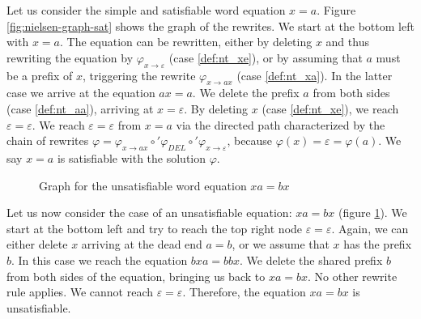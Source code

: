 Let us consider the simple and satisfiable word equation $x = a$. Figure \ref{fig:nielsen-graph-sat} shows the graph of the rewrites. We start at the bottom left with $x = a$. The equation can be rewritten, either by deleting $x$ and thus rewriting the equation by $\varphi_{x \rightarrow \varepsilon}$ (case \ref{def:nt_xe}), or by assuming that $a$ must be a prefix of $x$, triggering the rewrite $\varphi_{x \rightarrow ax}$ (case \ref{def:nt_xa}). In the latter case we arrive at the equation $ax = a$. We delete the prefix $a$ from both sides (case \ref{def:nt_aa}), arriving at $x = \varepsilon$. By deleting $x$ (case \ref{def:nt_xe}), we reach $\varepsilon = \varepsilon$. We reach $\varepsilon = \varepsilon$ from $x = a$ via the directed path characterized by the chain of rewrites $\varphi = \varphi_{x \rightarrow ax} \circ' \varphi_{DEL} \circ' \varphi_{x \rightarrow \varepsilon}$, because $\varphi(x) = \varepsilon = \varphi(a)$. We say $x = a$ is satisfiable with the solution $\varphi$.

\begin{figure}[H]
\begin{center}
\caption{Graph for the unsatisfiable word equation $xa = bx$}
\label{fig:nielsen-graph-unsat}
\end{center}
\end{figure}

Let us now consider the case of an unsatisfiable equation: $xa = bx$ (figure \ref{fig:nielsen-graph-unsat}). We start at the bottom left and try to reach the top right node $\varepsilon = \varepsilon$. Again, we can either delete $x$ arriving at the dead end $a = b$, or we assume that $x$ has the prefix $b$. In this case we reach the equation $bxa = bbx$. We delete the shared prefix $b$ from both sides of the equation, bringing us back to $xa = bx$. No other rewrite rule applies. We cannot reach $\varepsilon = \varepsilon$. Therefore, the equation $xa = bx$ is unsatisfiable.

